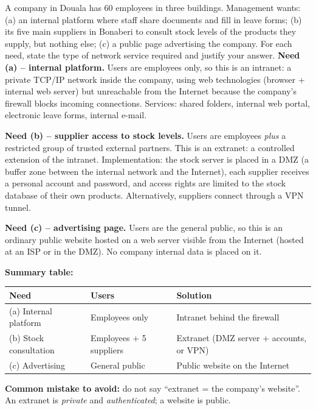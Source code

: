 \documentclass[11pt]{article}
\newcommand{\cle}[1]{{\popxbold\color{popdark}#1}}
\begin{document}
\begin{exoresolu}
A company in Douala has 60 employees in three buildings. Management wants: (a) an internal platform where staff share documents and fill in leave forms; (b) its five main suppliers in Bonaberi to consult stock levels of the products they supply, but nothing else; (c) a public page advertising the company. For each need, state the type of network service required and justify your answer.
\tcblower
\textbf{Need (a) -- internal platform.} Users are employees only, so this is an \cle{intranet}: a private TCP/IP network inside the company, using web technologies (browser + internal web server) but unreachable from the Internet because the company's firewall blocks incoming connections. Services: shared folders, internal web portal, electronic leave forms, internal e-mail.

\textbf{Need (b) -- supplier access to stock levels.} Users are employees \emph{plus} a restricted group of trusted external partners. This is an \cle{extranet}: a controlled extension of the intranet. Implementation: the stock server is placed in a \cle{DMZ} (a buffer zone between the internal network and the Internet), each supplier receives a personal account and password, and access rights are limited to the stock database of their own products. Alternatively, suppliers connect through a VPN tunnel.

\textbf{Need (c) -- advertising page.} Users are the general public, so this is an ordinary \cle{public website} hosted on a web server visible from the Internet (hosted at an ISP or in the DMZ). No company internal data is placed on it.

\textbf{Summary table:}
\begin{center}
\begin{tabularx}{\linewidth}{|l|X|X|}
\hline
\rowcolor{popblueL} Need & Users & Solution \\ \hline
(a) Internal platform & Employees only & Intranet behind the firewall \\ \hline
(b) Stock consultation & Employees + 5 suppliers & Extranet (DMZ server + accounts, or VPN) \\ \hline
(c) Advertising & General public & Public website on the Internet \\ \hline
\end{tabularx}
\end{center}
\textbf{Common mistake to avoid:} do not say ``extranet = the company's website''. An extranet is \emph{private} and \emph{authenticated}; a website is public.
\end{exoresolu}
\end{document}
